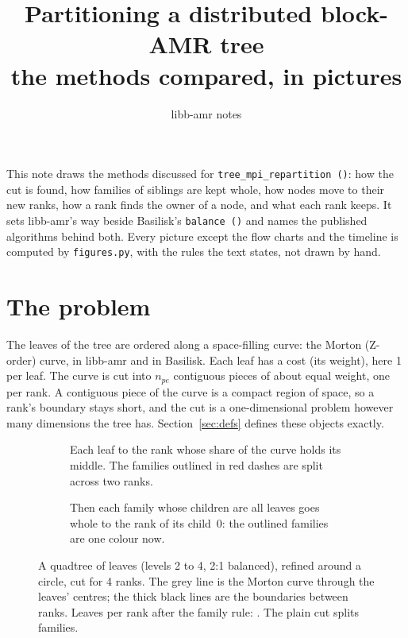 \documentclass[10pt,a4paper]{article}
\title{Partitioning a distributed block-AMR tree\\[2pt]
  \large the methods compared, in pictures}
\author{libb-amr notes}
\date{}
\theoremstyle{definition}
\newcommand{\fn}[1]{\texttt{#1}}
\begin{document}
\maketitle

\noindent
This note draws the methods discussed for \fn{tree\_mpi\_repartition ()}:
how the cut is found, how families of siblings are kept whole, how nodes
move to their new ranks, how a rank finds the owner of a node, and what
each rank keeps. It sets libb-amr's way beside Basilisk's \fn{balance ()}
and names the published algorithms behind both. Every picture except the
flow charts and the timeline is computed by \fn{figures.py}, with the
rules the text states, not drawn by hand.

\tableofcontents

\section{The problem}
\label{sec:problem}

The leaves of the tree are ordered along a space-filling curve: the Morton
(Z-order) curve, in libb-amr and in Basilisk. Each leaf has a cost (its
weight), here 1 per leaf. The curve is cut into $n_{pe}$ contiguous pieces
of about equal weight, one per rank. A contiguous piece of the curve is a
compact region of space, so a rank's boundary stays short, and the cut is
a one-dimensional problem however many dimensions the tree has.
Section~\ref{sec:defs} defines these objects exactly.

\begin{figure}[h]
  \centering
  \begin{subfigure}[t]{0.48\textwidth}
    \centering
    \begin{tikzpicture}\end{tikzpicture}
    \caption{Each leaf to the rank whose share of the curve holds its
      middle. The families outlined in red dashes are split across two ranks.}
  \end{subfigure}\hfill
  \begin{subfigure}[t]{0.48\textwidth}
    \centering
    \begin{tikzpicture}\end{tikzpicture}
    \caption{Then each family whose children are all leaves goes whole to
      the rank of its child~0: the outlined families are one colour now.}
  \end{subfigure}
  \caption{A quadtree of \nleaves{} leaves (levels 2 to 4, 2:1 balanced),
    refined around a circle, cut for 4 ranks. The grey line is the Morton
    curve through the leaves' centres; the thick black lines are the
    boundaries between ranks. Leaves per rank after the family rule:
    \famcounts{}. The plain cut splits \nsplit{} families.}
  \label{fig:curve}
\end{figure}
\end{document}
